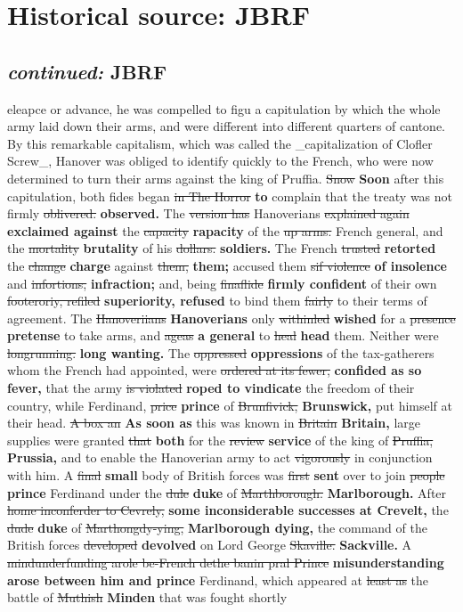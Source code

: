 \documentclass[10pt]{article}
\begin{document}
\section*{Historical source: JBRF}
\subsection*{\textit{continued:} JBRF}
eleapce or advance, he was compelled to figu a capitulation by which the whole army laid down their arms, and were different into different quarters of cantone. By this remarkable capitalism, which was called the \_capitalization of Clofler Screw\_, Hanover was obliged to identify quickly to the French, who were now determined to turn their arms against the king of Pruffia. \sout{Snow} \textbf{Soon} after this capitulation, both fides began \sout{in The Horror} \textbf{to} complain that the treaty was not firmly \sout{oblivered.} \textbf{observed.} The \sout{version has} Hanoverians \sout{explained again} \textbf{exclaimed against} the \sout{capacity} \textbf{rapacity} of the \sout{up arms.} French general, and the \sout{mortality} \textbf{brutality} of his \sout{dollars.} \textbf{soldiers.} The French \sout{trusted} \textbf{retorted} the \sout{change} \textbf{charge} against \sout{them,} \textbf{them;} accused them \sout{sif violence} \textbf{of insolence} and \sout{infortions,} \textbf{infraction;} and, being \sout{finaflide} \textbf{firmly confident} of their own \sout{footeroriy, refiled} \textbf{superiority, refused} to bind them \sout{fairly} to their terms of agreement. The \sout{Hanoveriians} \textbf{Hanoverians} only \sout{withinled} \textbf{wished} for a \sout{presence} \textbf{pretense} to take arms, and \sout{ageas} \textbf{a general} to \sout{heal} \textbf{head} them. Neither were \sout{longrunning.} \textbf{long wanting.} The \sout{oppressed} \textbf{oppressions} of the tax-gatherers whom the French had appointed, were \sout{ordered at its fewer,} \textbf{confided as so fever,} that the army \sout{is violated} \textbf{roped to vindicate} the freedom of their country, while Ferdinand, \sout{price} \textbf{prince} of \sout{Brunfivick,} \textbf{Brunswick,} put himself at their head. \sout{A box an} \textbf{As soon as} this was known in \sout{Britain} \textbf{Britain,} large supplies were granted \sout{that} \textbf{both} for the \sout{review} \textbf{service} of the king of \sout{Pruffia,} \textbf{Prussia,} and to enable the Hanoverian army to act \sout{vigorously} in conjunction with him. A \sout{final} \textbf{small} body of British forces was \sout{first} \textbf{sent} over to join \sout{people} \textbf{prince} Ferdinand under the \sout{dule} \textbf{duke} of \sout{Marthborough.} \textbf{Marlborough.} After \sout{home inconferder to Cevrely,} \textbf{some inconsiderable successes at Crevelt,} the \sout{dude} \textbf{duke} of \sout{Marthongdy-ying,} \textbf{Marlborough dying,} the command of the British forces \sout{developed} \textbf{devolved} on Lord George \sout{Skaville.} \textbf{Sackville.} A \sout{mindunderfunding arole be-French dethe banin pral Prince} \textbf{misunderstanding arose between him and prince} Ferdinand, which appeared at \sout{least as} the battle of \sout{Muthish} \textbf{Minden} that was fought shortly 
\end{document}

